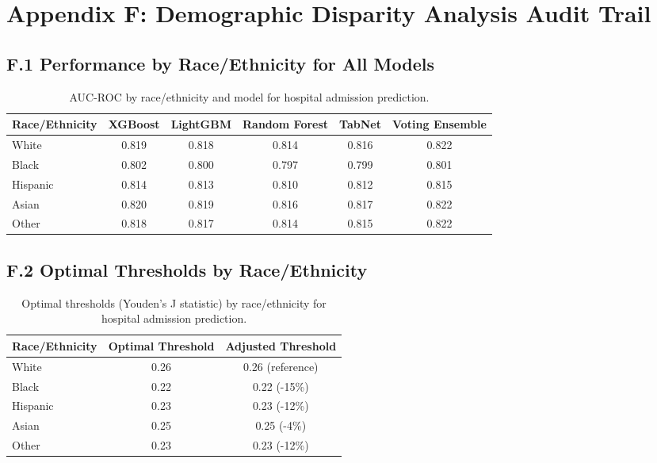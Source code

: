 \documentclass[11pt]{article}
\begin{document}
\section{Appendix F: Demographic Disparity Analysis Audit Trail}

\subsection{F.1 Performance by Race/Ethnicity for All Models}

\begin{table}[H]
\centering
\caption{AUC-ROC by race/ethnicity and model for hospital admission prediction.}
\begin{tabular}{@{}lccccc@{}}
\toprule
\textbf{Race/Ethnicity} & \textbf{XGBoost} & \textbf{LightGBM} & \textbf{Random Forest} & \textbf{TabNet} & \textbf{Voting Ensemble} \\
\midrule
White & 0.819 & 0.818 & 0.814 & 0.816 & 0.822 \\
Black & 0.802 & 0.800 & 0.797 & 0.799 & 0.801 \\
Hispanic & 0.814 & 0.813 & 0.810 & 0.812 & 0.815 \\
Asian & 0.820 & 0.819 & 0.816 & 0.817 & 0.822 \\
Other & 0.818 & 0.817 & 0.814 & 0.815 & 0.822 \\
\bottomrule
\end{tabular}
\end{table}

\subsection{F.2 Optimal Thresholds by Race/Ethnicity}

\begin{table}[H]
\centering
\caption{Optimal thresholds (Youden's J statistic) by race/ethnicity for hospital admission prediction.}
\begin{tabular}{@{}lcc@{}}
\toprule
\textbf{Race/Ethnicity} & \textbf{Optimal Threshold} & \textbf{Adjusted Threshold} \\
\midrule
White & 0.26 & 0.26 (reference) \\
Black & 0.22 & 0.22 (-15\%) \\
Hispanic & 0.23 & 0.23 (-12\%) \\
Asian & 0.25 & 0.25 (-4\%) \\
Other & 0.23 & 0.23 (-12\%) \\
\bottomrule
\end{tabular}
\end{table}
\end{document}

